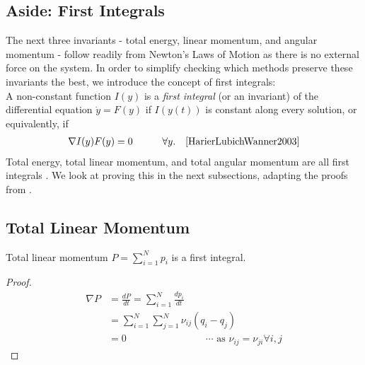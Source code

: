 \documentclass[../Main.tex]{subfiles}
\begin{document}
\subsection*{Aside: First Integrals}
The next three invariants - total energy, linear momentum, and angular momentum - follow readily from Newton's Laws of Motion as there is no external force on the system. In order to simplify checking which methods preserve these invariants the best, we introduce the concept of first integrals: \\
A non-constant function $I(y)$ is a \textit{first integral} (or an invariant) of the differential equation $\dot{y} = F(y)$ if $I(y(t))$ is constant along every solution, or equivalently, if
\begin{align}
\nabla I(y)F(y) = 0    \quad \quad \quad  \forall y. \quad \cite{HarierLubichWanner2003} \label{eqn:grad_first_integral_zero}
\end{align}
Total energy, total linear momentum, and total angular momentum are all first integrals \cite{HarierLubichWanner2003}. We look at proving this in the next subsections, adapting the proofs from \cite{HarierLubichWanner2003}.

\subsection{Total Linear Momentum}
 
\begin{theorem} Total linear momentum $P = \sum_{i=1}^{N} p_{i}$ is a first integral. \end{theorem}
\begin{proof}
\begin{align*}
\nabla P & = \frac{dP}{dt} = \sum_{i=1}^{N} \frac{dp_{i}}{dt} \\
&=\sum_{i=1}^{N}\sum_{j=1}^{N}\nu_{ij}\left(q_{i} - q_{j}\right) \\
& = 0 \qquad \qquad \qquad \qquad \cdots \mbox{ as }\nu_{ij} = \nu_{ji} \forall i, j
\end{align*}
\end{proof} 
\end{document}
